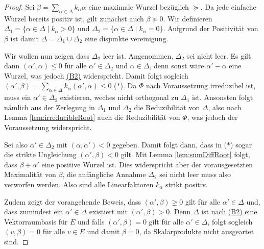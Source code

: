 \begin{proof}
  Sei $\beta = \sum_{\alpha \in \Delta} k_\alpha \alpha$ eine maximale Wurzel bezüglich $\succeq$.
  Da jede einfache Wurzel bereits positiv ist, gilt zunächst auch $\beta \succeq 0$.
  Wir definieren $\Delta_1 = \{\alpha \in \Delta \mid k_\alpha > 0\}$ und $\Delta_2 = \{\alpha \in \Delta \mid k_\alpha = 0\}$.
  Aufgrund der Positivität von $\beta$ ist damit $\Delta = \Delta_1 \cup \Delta_2$ eine disjunkte vereinigung.

  Wir wollen nun zeigen dass $\Delta_2$ leer ist.
  Angenommen, $\Delta_2$ sei nicht leer.
  Es gilt dann $(\alpha', \alpha) \leq 0$ für alle $\alpha' \in \Delta_2$ und $\alpha \in \Delta$, denn sonst wäre $\alpha' - \alpha$ eine Wurzel, was jedoch \hyperref[it:B2]{(B2)} widerspricht.
  Damit folgt sogleich $(\alpha', \beta) = \sum_{\alpha \in \Delta} k_\alpha (\alpha', \alpha) \leq 0 $ ($\ast$).
  Da $\Phi$ nach Voraussetzung irreduzibel ist, muss ein $\alpha' \in \Delta_2$ existieren, weches nicht orthogonal zu $\Delta_1$ ist.
  Ansonsten folgt nämlich aus der Zerlegung in $\Delta_1$ und $\Delta_2$ die Reduzibilität von $\Delta$, also nach Lemma \ref{lem:irreducibleRoot} auch die Reduzibilität von $\Phi$, was jedoch der Voraussetzung widerspricht.

  Sei also $\alpha' \in \Delta_2$ mit $(\alpha, \alpha') < 0$ gegeben.
  Damit folgt dann, dass in ($\ast$) sogar die strikte Ungleichung $(\alpha', \beta) < 0$ gilt.
  Mit Lemma \ref{lem:sumDiffRoot} folgt, dass $\beta + \alpha'$ eine positive Wurzel ist.
  Dies widerspricht aber der vorausgesetzten Maximalität von $\beta$, die anfängliche Annahme $\Delta_2$ sei nicht leer muss also verworfen werden.
  Also sind alle Linearfaktoren $k_\alpha$ strikt positiv.

  Zudem zeigt der vorangehende Beweis, dass $(\alpha', \beta) \geq 0$ gilt für alle $\alpha' \in \Delta$ und, dass zumindest ein $\alpha' \in \Delta$ existiert mit $(\alpha', \beta) > 0$.
    Denn $\Delta$ ist nach \hyperref[it:B2]{(B2)} eine Vektorraumbasis für $E$ und falls $(\alpha', \beta) = 0$ gilt für alle $\alpha' \in \Delta$, folgt sogleich $(v, \beta) = 0$ für alle $v \in E$ und damit $\beta = 0$, da Skalarprodukte nicht ausgeartet sind.


\end{proof}
